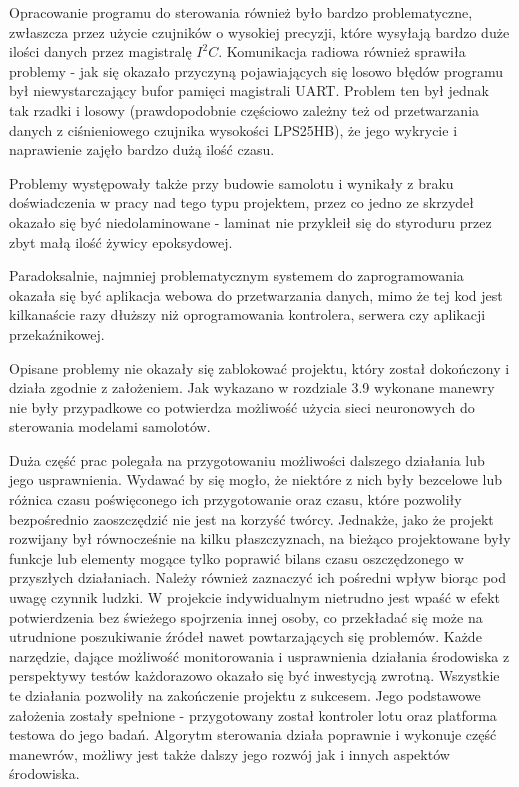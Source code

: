 \documentclass[12pt, a4paper]{article}
\begin{document}
Opracowanie programu do sterowania również było bardzo problematyczne, zwłaszcza przez użycie czujników o wysokiej precyzji, które wysyłają bardzo duże ilości danych przez magistralę $I^2C$. Komunikacja radiowa również sprawiła problemy - jak się okazało przyczyną pojawiających się losowo błędów programu był niewystarczający bufor pamięci magistrali UART. Problem ten był jednak tak rzadki i losowy (prawdopodobnie częściowo zależny też od przetwarzania danych z ciśnieniowego czujnika wysokości LPS25HB), że jego wykrycie i naprawienie zajęło bardzo dużą ilość czasu.

Problemy występowały także przy budowie samolotu i wynikały z braku doświadczenia w pracy nad tego typu projektem, przez co jedno ze skrzydeł okazało się być niedolaminowane - laminat nie przykleił się do styroduru przez zbyt małą ilość żywicy epoksydowej.

Paradoksalnie, najmniej problematycznym systemem do zaprogramowania okazała się być aplikacja webowa do przetwarzania danych, mimo że tej kod jest kilkanaście razy dłuższy niż oprogramowania kontrolera, serwera czy aplikacji przekaźnikowej.

Opisane problemy nie okazały się zablokować projektu, który został dokończony i działa zgodnie z założeniem. Jak wykazano w rozdziale 3.9 wykonane manewry nie były przypadkowe co potwierdza możliwość użycia sieci neuronowych do sterowania modelami samolotów. 

Duża część prac polegała na przygotowaniu możliwości dalszego działania lub jego usprawnienia. Wydawać by się mogło, że niektóre z nich były bezcelowe lub różnica czasu poświęconego ich przygotowanie oraz czasu, które pozwoliły bezpośrednio zaoszczędzić nie jest na korzyść twórcy. Jednakże, jako że projekt rozwijany był równocześnie na kilku płaszczyznach, na bieżąco projektowane były funkcje lub elementy mogące tylko poprawić bilans czasu oszczędzonego w przyszłych działaniach. Należy również zaznaczyć ich pośredni wpływ biorąc pod uwagę czynnik ludzki. W projekcie indywidualnym nietrudno jest wpaść w efekt potwierdzenia bez świeżego spojrzenia innej osoby, co przekładać się może na utrudnione poszukiwanie źródeł nawet powtarzających się problemów. Każde narzędzie, dające możliwość monitorowania i usprawnienia działania środowiska z perspektywy testów każdorazowo okazało się być inwestycją zwrotną. Wszystkie te działania pozwoliły na zakończenie projektu z sukcesem. Jego podstawowe założenia zostały spełnione -  przygotowany został kontroler lotu oraz platforma testowa do jego badań. Algorytm sterowania działa poprawnie i wykonuje część manewrów, możliwy jest także dalszy jego rozwój jak i innych aspektów środowiska.
\end{document}
